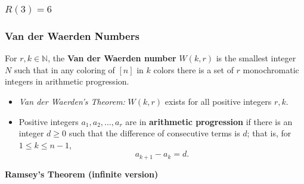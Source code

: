 \documentclass{beamer}
\begin{document}
\begin{frame}
	\frametitle{\( R(3) = 6 \)}
    \begin{figure}
        \centering
    \end{figure}
\end{frame}

\begin{frame}
	\frametitle{Van der Waerden Numbers} For \( r, k \in \mathbb{N} \), the \textbf{Van der Waerden number} \( W(k,r) \) is the smallest integer \( N \) such that in any coloring of \( [n] \) in \( k \) colors there is a set of \( r \) monochromatic integers in arithmetic progression.
\begin{itemize}
	\item \emph{Van der Waerden's Theorem:} \( W(k,r) \) exists for all positive integers \( r,k\).
	\item Positive integers \( a_1, a_2, \hdots , a_{r}  \) are in \textbf{arithmetic progression} if there is an integer \( d \geq 0 \) such that the difference of consecutive terms is \( d \); that is, for \( 1 \leq k \leq n - 1 \), \[ a_{k+1} - a_{k} = d. \]
\end{itemize}
\end{frame}

\begin{frame}
\begin{center}
	\Large{\textbf{Ramsey's Theorem (infinite version)}}
\end{center}
\end{frame}
\end{document}
